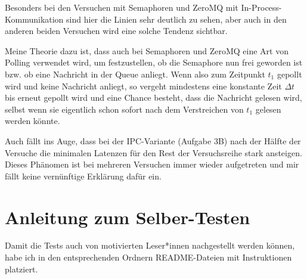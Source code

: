 \documentclass[12pt]{article}
\begin{document}
Besonders bei den Versuchen mit Semaphoren und ZeroMQ mit In-Process-Kommunikation sind hier die Linien sehr deutlich zu sehen, aber auch in den anderen beiden Versuchen wird eine solche Tendenz sichtbar.

Meine Theorie dazu ist, dass auch bei Semaphoren und ZeroMQ eine Art von Polling verwendet wird, um festzustellen, ob die Semaphore nun frei geworden ist bzw. ob eine Nachricht in der Queue anliegt.
Wenn also zum Zeitpunkt $t_1$ gepollt wird und keine Nachricht anliegt, so vergeht mindestens eine konstante Zeit $\Delta t$ bis erneut gepollt wird und eine Chance besteht, dass die Nachricht gelesen wird, selbst wenn sie eigentlich schon sofort nach dem Verstreichen von $t_1$ gelesen werden könnte.

Auch fällt ins Auge, dass bei der IPC-Variante (Aufgabe 3B) nach der Hälfte der Versuche die minimalen Latenzen für den Rest der Versuchsreihe stark ansteigen.
Dieses Phänomen ist bei mehreren Versuchen immer wieder aufgetreten und mir fällt keine vernünftige Erklärung dafür ein.

\section{Anleitung zum Selber-Testen}
Damit die Tests auch von motivierten Leser*innen nachgestellt werden können, habe ich in den entsprechenden Ordnern README-Dateien mit Instruktionen platziert.
\end{document}

